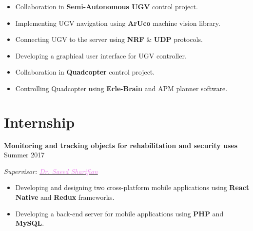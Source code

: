 \documentclass[11pt,a4paper,roman]{moderncv} %
\begin{document}
\begin{itemize}
\begin{adjustwidth}{0.2in}{0in}
		\begin{itemize}
			\item Collaboration in \textbf{Semi-Autonomous UGV} control project.
			\item Implementing UGV navigation using \textbf{ArUco} machine vision library.
			\item Connecting UGV to the server using \textbf{NRF} \& \textbf{UDP} protocols.
			\item Developing a graphical user interface for UGV controller.
			\item Collaboration in \textbf{Quadcopter} control project.
			\item Controlling Quadcopter using \textbf{Erle-Brain} and APM planner software.
		\end{itemize}
	\end{adjustwidth}
\end{itemize}

\section{Internship}

\textbf{Monitoring and tracking objects for rehabilitation and security uses} \hfill Summer 2017

\emph{Supervisor: \href{http://ele.aut.ac.ir/~sharifian}{\textcolor{violet}{Dr. Saeed Sharifian}}}

\begin{adjustwidth}{0.2in}{0in}
	\begin{itemize}
		\item Developing and designing two cross-platform mobile applications using \textbf{React Native} and \textbf{Redux} frameworks.
		\item Developing a back-end server for mobile applications using \textbf{PHP} and \textbf{MySQL}.
	\end{itemize}
\end{adjustwidth}

\end{document}
